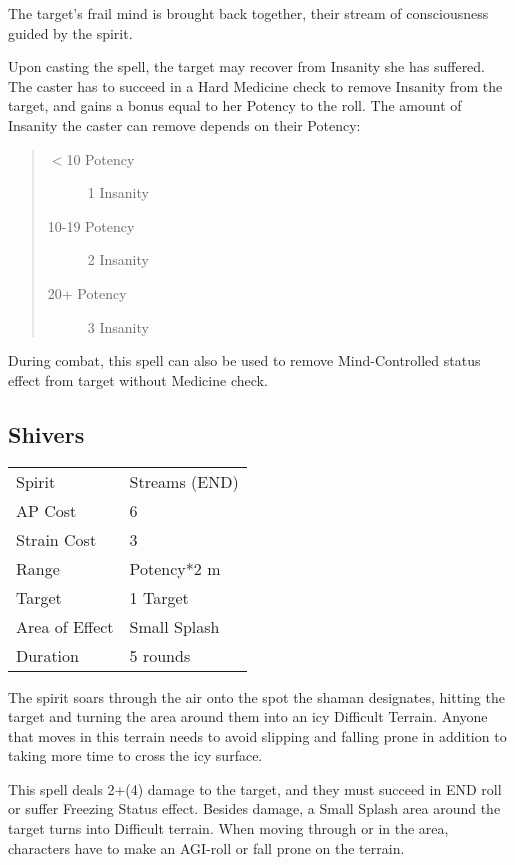 \documentclass[11pt,a4paper,twocolumn]{book}
\begin{document}
\medskip

The target's frail mind is brought back together, their stream of consciousness guided by the spirit.

Upon casting the spell, the target may recover from Insanity she has suffered. The caster has to succeed in a Hard Medicine check to remove Insanity from the target, and gains a bonus equal to her Potency to the roll. The amount of Insanity the caster can remove depends on their Potency:

\begin{quote}
	\begin{description}
		\item[$<$10 Potency] 	1 Insanity
		\item[10-19 Potency] 	2 Insanity
		\item[20+ Potency] 	    3 Insanity	
	\end{description}	
\end{quote}

During combat, this spell can also be used to remove Mind-Controlled status effect from target without Medicine check.

\subsection*{Shivers}
{
	\begin{tabu} to 75mm{| X[l,4] | X[l,7] |}
		\hline
		Spirit 			& Streams (END) 		\\
		AP Cost	      	& 6 						\\
		Strain Cost     & 3 						\\
		Range     		& Potency*2	m				\\
		Target      	& 1 Target					\\
		Area of Effect  & Small Splash  	 				\\
		Duration     	& 5 rounds			\\ \hline
	\end{tabu}
	
}

The spirit soars through the air onto the spot the shaman designates, hitting the target and turning the area around them into an icy Difficult Terrain. Anyone that moves in this terrain needs to avoid slipping and falling prone in addition to taking more time to cross the icy surface.

This spell deals 2+(4) damage to the target, and they must succeed in END roll or suffer Freezing Status effect. Besides damage, a Small Splash area around the target turns into Difficult terrain. When moving through or in the area, characters have to make an AGI-roll or fall prone on the terrain.
\end{document}
